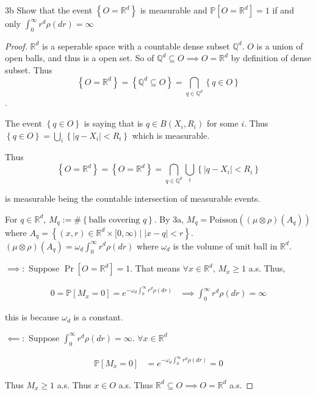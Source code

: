 \documentclass{article}
\newcommand*{\subeq}{\subseteq}
\newcommand{\R}{\mathbb{R}}
\newcommand{\Q}{\mathbb{Q}}
\newcommand{\PR}{\mathbb{P}}
\newcommand{\abs}[1]{\left\lvert #1\right\rvert}
\newcommand{\Poi}[0]{\text{Poisson}}
\begin{document}
\begin{claim}{3b}\label{Claim 3b.}
    Show that the event $\left\{ O = \R^d \right\}$ is measurable and $\PR[O = \R^d] = 1$ if and only $\int_{0}^{\infty} r^d \rho(dr) = \infty$   
\end{claim}
\begin{proof}
    $\R^d$ is a seperable space with a countable dense subset $\Q^d$. $O$ is a union of open balls, and thus is a open set. So of $\Q^d \subeq O \implies O = \R^d$ by definition of dense subset. Thus \[\left\{ O = \R^d \right\} = \left\{ \Q^d \subeq O \right\} = \bigcap_{q \in \Q^d} \left\{ q \in O \right\}\].
    
    The event $\left\{ q \in O \right\}$ is saying that is $q \in B(X_i, R_i)$ for some $i$. Thus $\left\{ q \in O \right\} = \bigcup_{i}\left\{ \abs{q - X_i} < R_i \right\}$ which is measurable. 

    Thus \[\left\{ O = \R^d \right\}  = \left\{ O = \R^d \right\} = \bigcap_{q \in \Q^d} \bigcup_{i}\left\{ \abs{q - X_i} < R_i \right\}\]

    is measurable being the countable intersection of measurable events. 

    For $q \in \R^d$, $M_q := \#\left\{ \text{balls covering } q \right\}$. By 3a, $M_q = \Poi((\mu \otimes \rho)(A_q))$ where $A_q = \left\{ (x, r) \in \R^d \times [0, \infty) \mid \abs{x - q} < r \right\}$. $(\mu \otimes \rho)(A_q) = \omega_d \int_{0}^{\infty} r^d \rho(dr)$ where $\omega_d$ is the volume of unit ball in $\R^d$.
    
    $\implies:$ Suppose $\Pr[O = \R^d] = 1$. That means $\forall x \in \R^d$, $M_x \geq 1$ a.s. Thus,
    
    \begin{align*}
        0 = \PR[M_x = 0] = e^{-\omega_d\int_{0}^{\infty} r^d \rho(dr)} &\implies \int_{0}^{\infty} r^d \rho(dr) = \infty
    \end{align*}

    this is because $\omega_d$ is a constant. 

    $\impliedby:$ Suppose $\int_{0}^{\infty} r^{d} \rho(dr) = \infty$. $\forall x \in \R^d$  
    
    \begin{align*}
        \PR[M_x = 0] &= e^{-\omega_d\int_{0}^{\infty} r^{d} \rho(dr)} = 0 
    \end{align*}

    Thus $M_x \geq 1$ a.s. Thus $x \in O$ a.s. Thus $\R^d \subeq O \implies O = \R^d$ a.s.    
\end{proof}
\end{document}

